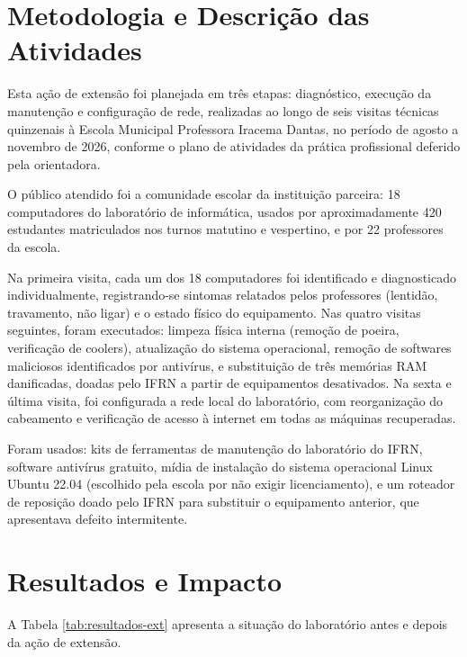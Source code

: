 \documentclass[article,12pt,a4paper]{abntex2}
\begin{document}
\section{Metodologia e Descrição das Atividades}

Esta ação de extensão foi planejada em três etapas: diagnóstico,
execução da manutenção e configuração de rede, realizadas ao longo de seis
visitas técnicas quinzenais à Escola Municipal Professora Iracema Dantas,
no período de agosto a novembro de 2026, conforme o plano de atividades da
prática profissional deferido pela orientadora.

O público atendido foi a comunidade escolar da instituição parceira: 18
computadores do laboratório de informática, usados por aproximadamente 420
estudantes matriculados nos turnos matutino e vespertino, e por 22
professores da escola.

Na primeira visita, cada um dos 18 computadores foi identificado e
diagnosticado individualmente, registrando-se sintomas relatados pelos
professores (lentidão, travamento, não ligar) e o estado físico do
equipamento. Nas quatro visitas seguintes, foram executados: limpeza
física interna (remoção de poeira, verificação de coolers), atualização
do sistema operacional, remoção de softwares maliciosos identificados por
antivírus, e substituição de três memórias RAM danificadas, doadas pelo
IFRN a partir de equipamentos desativados. Na sexta e última visita, foi
configurada a rede local do laboratório, com reorganização do cabeamento
e verificação de acesso à internet em todas as máquinas recuperadas.

Foram usados: kits de ferramentas de manutenção do laboratório do IFRN,
software antivírus gratuito, mídia de instalação do sistema operacional
Linux Ubuntu 22.04 (escolhido pela escola por não exigir licenciamento), e
um roteador de reposição doado pelo IFRN para substituir o equipamento
anterior, que apresentava defeito intermitente.

\section{Resultados e Impacto}

A Tabela \ref{tab:resultados-ext} apresenta a situação do laboratório
antes e depois da ação de extensão.
\end{document}
